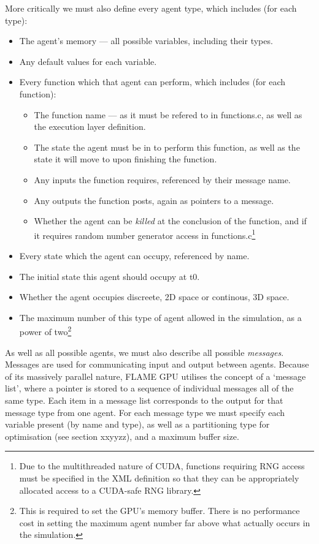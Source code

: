 \documentclass[11pt,a4paper]{article}
\begin{document}
More critically we must also define every agent type, which includes (for each type):
\begin{itemize}
 \item{The agent's memory --- all possible variables, including their types.}
 \item{Any default values for each variable.}
 \item{Every function which that agent can perform, which includes (for each function):}
 \begin{itemize}
  \item{The function name --- as it must be refered to in functions.c, as well as the execution layer definition.}
  \item{The state the agent must be in to perform this function, as well as the state it will move to upon finishing the function.}
  \item{Any inputs the function requires, referenced by their message name.}
  \item{Any outputs the function posts, again as pointers to a message.}
  \item{Whether the agent can be \emph{killed} at the conclusion of the function, and if it requires random number generator access in functions.c\footnote{Due to the multithreaded nature of CUDA, functions requiring RNG access must be specified in the XML definition so that they can be appropriately allocated access to a CUDA-safe RNG library.}}
 \end{itemize}
 \item{Every state which the agent can occupy, referenced by name.}
 \item{The initial state this agent should occupy at t0.}
 \item{Whether the agent occupies discreete, 2D space or continous, 3D space.}
 \item{The maximum number of this type of agent allowed in the simulation, as a power of two\footnote{This is required to set the GPU's memory buffer. There is no performance cost in setting the maximum agent number far above what actually occurs in the simulation.}}
\end{itemize}

As well as all possible agents, we must also describe all possible \emph{messages}. Messages are used for communicating input and output between agents. Because of its massively parallel nature, FLAME GPU utilises the concept of a `message list', where a pointer is stored to a sequence of individual messages all of the same type. Each item in a message list corresponds to the output for that message type from one agent. For each message type we must specify each variable present (by name and type), as well as a partitioning type for optimisation (see section xxyyzz), and a maximum buffer size.
\end{document}
